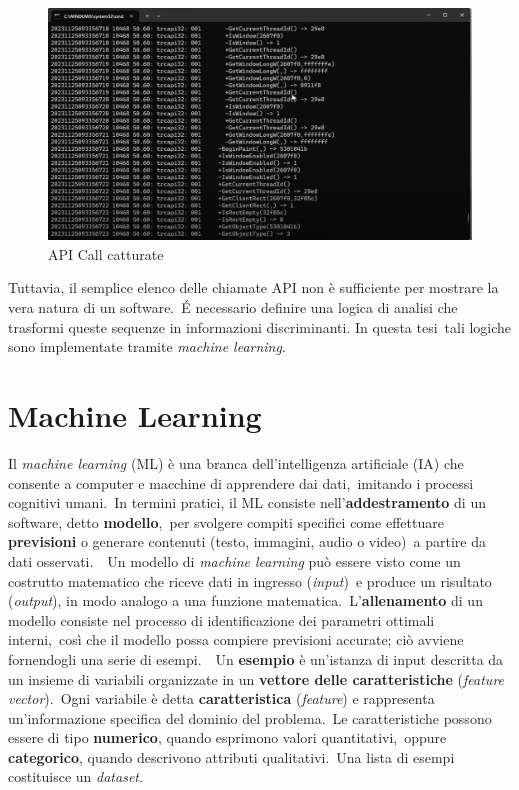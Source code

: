 \begin{figure}[htbp]
      \centering
      \includegraphics[width=1\textwidth]{./stato-dell-arte/imgs/api_call_example.png}
      \caption{API Call catturate}
      \label{fig:api_call_example}
\end{figure}

Tuttavia, il semplice elenco delle chiamate API non è sufficiente per mostrare la vera natura di un software.\
É necessario definire una logica di analisi che trasformi queste sequenze in informazioni discriminanti. In questa tesi\
tali logiche sono implementate tramite \textit{machine learning}.

\section{Machine Learning}

Il \textit{machine learning} (ML) è una branca dell'intelligenza artificiale (IA) che consente a computer e macchine di apprendere dai dati,\
imitando i processi cognitivi umani.\
In termini pratici, il ML consiste nell'\textbf{addestramento} di un software, detto \textbf{modello},\
per svolgere compiti specifici come effettuare \textbf{previsioni} o generare contenuti (testo, immagini, audio o video)\
a partire da dati osservati.\
\
Un modello di \textit{machine learning} può essere visto come un costrutto matematico che riceve dati in ingresso (\textit{input})\
e produce un risultato (\textit{output}), in modo analogo a una funzione matematica.\
L'\textbf{allenamento} di un modello consiste nel processo di identificazione dei parametri ottimali interni,\
così che il modello possa compiere previsioni accurate; ciò avviene fornendogli una serie di esempi.\
\
Un \textbf{esempio} è un'istanza di input descritta da un insieme di variabili organizzate in un \textbf{vettore delle caratteristiche}
(\textit{feature vector}).\
Ogni variabile è detta \textbf{caratteristica} (\textit{feature}) e rappresenta un'informazione specifica del dominio del problema.\
Le caratteristiche possono essere di tipo \textbf{numerico}, quando esprimono valori quantitativi,\
oppure \textbf{categorico}, quando descrivono attributi qualitativi.\
Una lista di esempi costituisce un \textit{dataset}.

